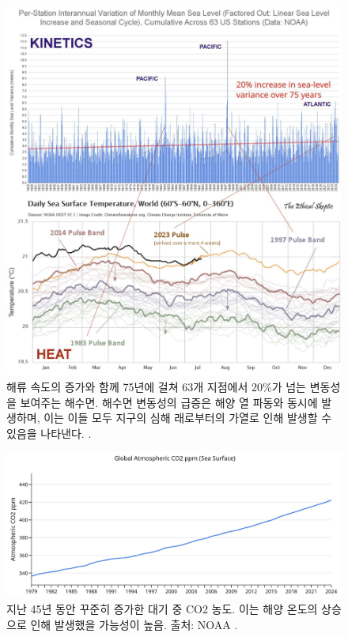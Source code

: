 \documentclass[10pt,twocolumn,letterpaper]{article}
\begin{document}
\begin{figure}[t]
\begin{center}
\includegraphics[width=1\textwidth]{sealevel.jpeg}
\end{center}
   \caption{해류 속도의 증가와 함께 75년에 걸쳐 63개 지점에서  20\%가 넘는 변동성을 보여주는 해수면. 해수면 변동성의 급증은 해양 열 파동와 동시에 발생하며, 이는 이들 모두  지구의 심해  래로부터의 가열로 인해 발생할 수 있음을 나타낸다. \cite{2,129}.}
\label{fig:20}
\end{figure}

\begin{figure}[t]
\begin{center}
\includegraphics[width=1\textwidth]{co2.jpg}
\end{center}
   \caption{ 지난 45년 동안 꾸준히 증가한 대기 중 CO2 농도. 이는 해양 온도의 상승으로 인해 발생했을 가능성이 높음. 출처: NOAA \cite{148,129}.}
\label{fig:21}
\end{figure}
\end{document}
